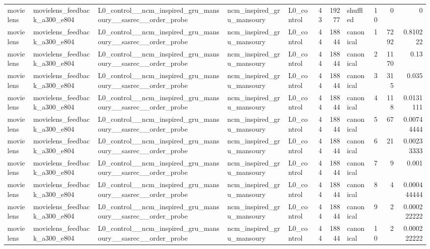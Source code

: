 \begin{table}[htbp!]
\begin{tabular}{lllllrrlrrr}
movielens & movielens\_feedback\_a300\_e804 & L0\_control\_\_ncm\_inspired\_gru\_mansoury\_\_sasrec\_\_order\_probe & ncm\_inspired\_gru\_mansoury & L0\_control & 43 & 19277 & shuffled & 10 & 0 & 0 \\
movielens & movielens\_feedback\_a300\_e804 & L0\_control\_\_ncm\_inspired\_gru\_mansoury\_\_sasrec\_\_order\_probe & ncm\_inspired\_gru\_mansoury & L0\_control & 44 & 18844 & canonical & 1 & 7292 & 0.810222 \\
movielens & movielens\_feedback\_a300\_e804 & L0\_control\_\_ncm\_inspired\_gru\_mansoury\_\_sasrec\_\_order\_probe & ncm\_inspired\_gru\_mansoury & L0\_control & 44 & 18844 & canonical & 2 & 1170 & 0.13 \\
movielens & movielens\_feedback\_a300\_e804 & L0\_control\_\_ncm\_inspired\_gru\_mansoury\_\_sasrec\_\_order\_probe & ncm\_inspired\_gru\_mansoury & L0\_control & 44 & 18844 & canonical & 3 & 315 & 0.035 \\
movielens & movielens\_feedback\_a300\_e804 & L0\_control\_\_ncm\_inspired\_gru\_mansoury\_\_sasrec\_\_order\_probe & ncm\_inspired\_gru\_mansoury & L0\_control & 44 & 18844 & canonical & 4 & 118 & 0.0131111 \\
movielens & movielens\_feedback\_a300\_e804 & L0\_control\_\_ncm\_inspired\_gru\_mansoury\_\_sasrec\_\_order\_probe & ncm\_inspired\_gru\_mansoury & L0\_control & 44 & 18844 & canonical & 5 & 67 & 0.00744444 \\
movielens & movielens\_feedback\_a300\_e804 & L0\_control\_\_ncm\_inspired\_gru\_mansoury\_\_sasrec\_\_order\_probe & ncm\_inspired\_gru\_mansoury & L0\_control & 44 & 18844 & canonical & 6 & 21 & 0.00233333 \\
movielens & movielens\_feedback\_a300\_e804 & L0\_control\_\_ncm\_inspired\_gru\_mansoury\_\_sasrec\_\_order\_probe & ncm\_inspired\_gru\_mansoury & L0\_control & 44 & 18844 & canonical & 7 & 9 & 0.001 \\
movielens & movielens\_feedback\_a300\_e804 & L0\_control\_\_ncm\_inspired\_gru\_mansoury\_\_sasrec\_\_order\_probe & ncm\_inspired\_gru\_mansoury & L0\_control & 44 & 18844 & canonical & 8 & 4 & 0.000444444 \\
movielens & movielens\_feedback\_a300\_e804 & L0\_control\_\_ncm\_inspired\_gru\_mansoury\_\_sasrec\_\_order\_probe & ncm\_inspired\_gru\_mansoury & L0\_control & 44 & 18844 & canonical & 9 & 2 & 0.000222222 \\
movielens & movielens\_feedback\_a300\_e804 & L0\_control\_\_ncm\_inspired\_gru\_mansoury\_\_sasrec\_\_order\_probe & ncm\_inspired\_gru\_mansoury & L0\_control & 44 & 18844 & canonical & 10 & 2 & 0.000222222 \\

\end{tabular}
\end{table}
